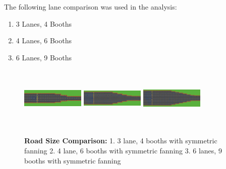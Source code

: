 \documentclass{article}
\begin{document}
The following lane comparison was used in the analysis:
\begin{enumerate}
\item 3 Lanes, 4 Booths
\item 4 Lanes, 6 Booths
\item 6 Lanes, 9 Booths
\end{enumerate}


\begin{figure}[H]
    \centering
    \includegraphics[width=3cm, height=3cm]{3l4bs}
   \includegraphics[width=3cm, height=3cm]{4l12bs}
\includegraphics[width=3cm, height=3cm]{6l18bs}
   \caption{\textbf{Road Size Comparison:} 1. 3 lane, 4 booths with symmetric fanning 2. 4 lane, 6 booths with symmetric fanning 3. 6 lanes, 9 booths with symmetric fanning}
\end{figure}

\\
\end{document}
